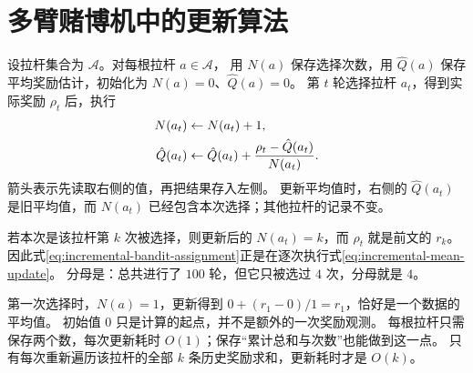 \documentclass[UTF8]{ctexart}
\begin{document}
\section{多臂赌博机中的更新算法}
\label{sec:incremental-mean-algorithm}

设拉杆集合为 $\mathcal A$。对每根拉杆 $a\in\mathcal A$，
用 $N(a)$ 保存选择次数，用 $\hat Q(a)$ 保存平均奖励估计，初始化为 $N(a)=0$、$\hat Q(a)=0$。
第 $t$ 轮选择拉杆 $a_t$，得到实际奖励 $\rho_t$ 后，执行
\begin{align}
  N(a_t)&\leftarrow N(a_t)+1,\notag\\
  \hat Q(a_t)&\leftarrow\hat Q(a_t)
    +\frac{\rho_t-\hat Q(a_t)}{N(a_t)}.
  \label{eq:incremental-bandit-assignment}
\end{align}
箭头表示先读取右侧的值，再把结果存入左侧。
更新平均值时，右侧的 $\hat Q(a_t)$ 是旧平均值，而 $N(a_t)$ 已经包含本次选择；其他拉杆的记录不变。

若本次是该拉杆第 $k$ 次被选择，则更新后的 $N(a_t)=k$，而 $\rho_t$ 就是前文的 $r_k$。
因此式\eqref{eq:incremental-bandit-assignment}正是在逐次执行式\eqref{eq:incremental-mean-update}。
分母是：总共进行了 $100$ 轮，但它只被选过 $4$ 次，分母就是 $4$。

第一次选择时，$N(a)=1$，更新得到 $0+(r_1-0)/1=r_1$，恰好是一个数据的平均值。
初始值 $0$ 只是计算的起点，并不是额外的一次奖励观测。
每根拉杆只需保存两个数，每次更新耗时 $O(1)$；保存“累计总和与次数”也能做到这一点。
只有每次重新遍历该拉杆的全部 $k$ 条历史奖励求和，更新耗时才是 $O(k)$。
\end{document}
